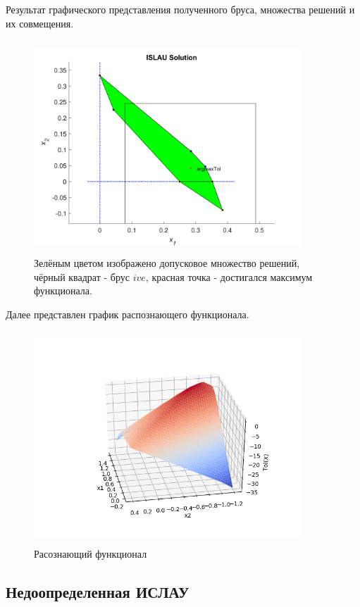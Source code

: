 \documentclass[12pt,a4paper]{scrartcl}
\begin{document}
Результат графического представления полученного бруса, множества решений и их совмещения.

\begin{figure}[H]
    \centering
    \includegraphics[width=10cm, height=8cm]{fig/ISLAU_1.png}
    \caption{Зелёным цветом изображено допусковое множество решений, чёрный квадрат - брус $ive$, красная точка - достигался максимум функционала.}
\end{figure}

Далее представлен график распознающего функционала.

\begin{figure}[H]
    \centering
    \includegraphics[width=10cm, height=8cm]{fig/Tol.png}
    \caption{Расознающий функционал}
\end{figure}

\subsection{Недоопределенная ИСЛАУ}
\end{document}
